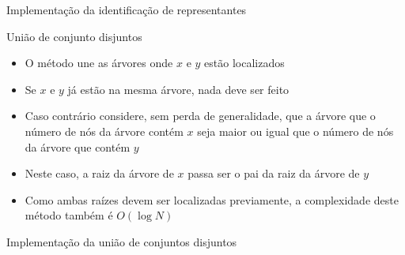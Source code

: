 \begin{frame}[fragile]{Implementação da identificação de representantes}
\end{frame}

\begin{frame}[fragile]{União de conjunto disjuntos}

    \begin{itemize}
        \item O método  une as árvores onde $x$ e $y$ estão localizados

        \item Se $x$ e $y$ já estão na mesma árvore, nada deve ser feito

        \item Caso contrário considere, sem perda de generalidade, que a árvore que o número de nós da árvore contém $x$ seja
            maior ou igual que o número de nós da árvore que contém $y$

        \item Neste caso, a raiz da árvore de $x$ passa ser o pai da raiz da árvore de $y$

        \item Como ambas raízes devem ser localizadas previamente, a complexidade deste método
            também é $O(\log N)$
            
    \end{itemize}

\end{frame}



\begin{frame}[fragile]{Implementação da união de conjuntos disjuntos}
\end{frame}
